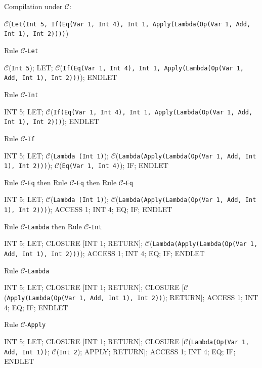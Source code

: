 \documentclass[11pt]{article}
\begin{document}
\begin{landscape}

\noindent Compilation under $\mathcal{C}$:

\bigskip

{\small

\noindent$\mathcal{C}$(\texttt{Let(Int 5, If(Eq(Var 1, Int 4), Int 1, Apply(Lambda(Op(Var 1, Add, Int 1), Int 2))))})

\smallskip
\noindent Rule $\mathcal{C}$-\texttt{Let}
\smallskip

\noindent $\mathcal{C}$(\texttt{Int 5}); LET; $\mathcal{C}$(\texttt{If(Eq(Var 1, Int 4), Int 1, Apply(Lambda(Op(Var 1, Add, Int 1), Int 2)))}); ENDLET

\smallskip
\noindent Rule $\mathcal{C}$-\texttt{Int}
\smallskip

\noindent INT 5; LET; $\mathcal{C}$(\texttt{If(Eq(Var 1, Int 4), Int 1, Apply(Lambda(Op(Var 1, Add, Int 1), Int 2)))}); ENDLET

\smallskip
\noindent Rule $\mathcal{C}$-\texttt{If}
\smallskip

\noindent INT 5; LET; $\mathcal{C}$(\texttt{Lambda (Int 1)}); $\mathcal{C}$(\texttt{Lambda(Apply(Lambda(Op(Var 1, Add, Int 1), Int 2)))}); $\mathcal{C}$(\texttt{Eq(Var 1, Int 4)}); IF; ENDLET


\smallskip
\noindent Rule $\mathcal{C}$-\texttt{Eq} then Rule $\mathcal{C}$-\texttt{Eq} then Rule $\mathcal{C}$-\texttt{Eq}
\smallskip

\noindent INT 5; LET; $\mathcal{C}$(\texttt{Lambda (Int 1)}); $\mathcal{C}$(\texttt{Lambda(Apply(Lambda(Op(Var 1, Add, Int 1), Int 2)))}); ACCESS 1; INT 4; EQ; IF; ENDLET

\smallskip
\noindent Rule $\mathcal{C}$-\texttt{Lambda} then Rule $\mathcal{C}$-\texttt{Int}
\smallskip

\noindent INT 5; LET; CLOSURE [INT 1; RETURN]; $\mathcal{C}$(\texttt{Lambda(Apply(Lambda(Op(Var 1, Add, Int 1), Int 2)))}); ACCESS 1; INT 4; EQ; IF; ENDLET

\smallskip
\noindent Rule $\mathcal{C}$-\texttt{Lambda}
\smallskip

\noindent INT 5; LET; CLOSURE [INT 1; RETURN]; CLOSURE [$\mathcal{C}$(\texttt{Apply(Lambda(Op(Var 1, Add, Int 1), Int 2))}); RETURN]; ACCESS 1; INT 4; EQ; IF; ENDLET

\smallskip
\noindent Rule $\mathcal{C}$-\texttt{Apply}
\smallskip

\noindent INT 5; LET; CLOSURE [INT 1; RETURN]; CLOSURE [$\mathcal{C}$(\texttt{Lambda(Op(Var 1, Add, Int 1))}; $\mathcal{C}$(\texttt{Int 2}); APPLY; RETURN]; ACCESS 1; INT 4; EQ; IF; ENDLET


}
\end{landscape}
\end{document}
